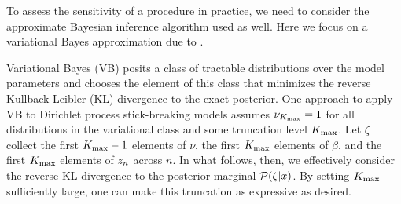 To assess the sensitivity of a procedure in practice, we need to consider the
approximate Bayesian inference algorithm used as well. Here we focus on a
variational Bayes approximation due to \citet{blei:2006:vi_for_dp}.

Variational Bayes (VB) posits a class of tractable distributions over the model
parameters and chooses the  element of this class that minimizes the reverse
Kullback-Leibler (KL) divergence to the exact posterior.  One approach to apply VB to Dirichlet process stick-breaking models
assumes $\nu_{K_{\mathrm{max}}} = 1$ for all distributions in the variational class and some
truncation level ${K_{\mathrm{max}}}$. Let $\zeta$ collect the first ${K_{\mathrm{max}}} - 1$ elements of
$\nu$, the first ${K_{\mathrm{max}}}$ elements of $\beta$, and the first ${K_{\mathrm{max}}}$ elements of
$z_n$ across $n$. In what follows, then, we effectively consider the reverse
KL divergence to the posterior marginal $\mathcal{P}(\zeta \vert x)$. By setting ${K_{\mathrm{max}}}$
sufficiently large, one can make this truncation as expressive as desired.

